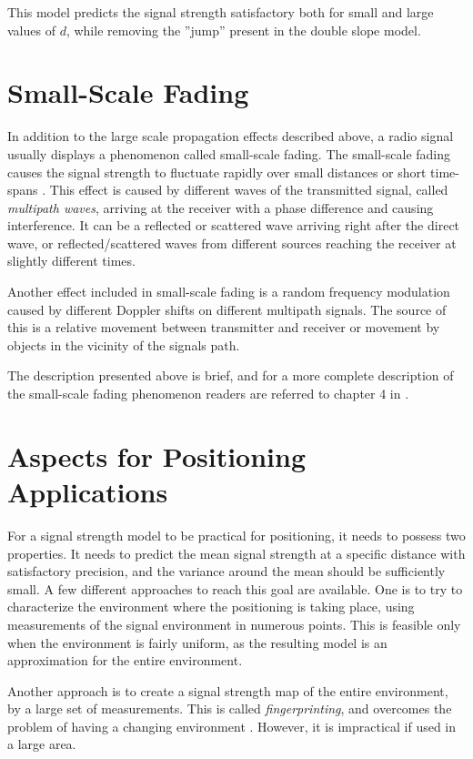 \documentclass{LTHthesis}
\begin{document}
This model predicts the signal strength satisfactory both for small and large values of $d$, while removing the ''jump'' present in the double slope model.
 \section{Small-Scale Fading}
In addition to the large scale propagation effects described above, a radio signal usually displays a phenomenon called small-scale fading. The small-scale fading causes the signal strength to fluctuate rapidly over small distances or short time-spans \cite{rappaport96}. This effect is caused by different waves of the transmitted signal, called \emph{multipath waves}, arriving at the receiver with a phase difference and causing interference. It can be a reflected or scattered wave arriving right after the direct wave, or reflected/scattered waves from different sources reaching the receiver at slightly different times. 

Another effect included in small-scale fading is a random frequency modulation caused by different Doppler shifts on different multipath signals. The source of this is a relative movement between transmitter and receiver or movement by objects in the vicinity of the signals path. 

The description presented above is brief, and for a more complete description of the small-scale fading phenomenon readers are referred to chapter 4 in \cite{rappaport96}.  
 \section{Aspects for Positioning Applications}
 \label{sec:AfPA}
 For a signal strength model to be practical for positioning, it needs to possess two properties. It needs to predict the mean signal strength at a specific distance with satisfactory precision, and the variance around the mean should be sufficiently small. A few different approaches to reach this goal are available. One is to try to characterize the environment where the positioning is taking place, using measurements of the signal environment in numerous points. This is feasible only when the environment is fairly uniform, as the resulting model is an approximation for the entire environment. 
 
 Another approach is to create a signal strength map of the entire environment, by a large set of measurements. This is called \emph{fingerprinting}, and overcomes the problem of having a changing environment \cite{fingerprinting}. However, it is impractical if used in a large area. 
 
\end{document}
